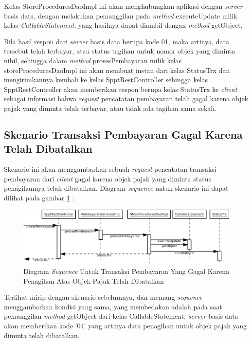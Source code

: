 Kelas StoreProceduresDaoImpl ini akan menghubungkan aplikasi dengan \textit{server} basis data, dengan melakukan pemanggilan pada \textit{method} executeUpdate milik kelas \textit{CallableStatement}, yang hasilnya dapat diambil dengan \textit{method} getObject.

Bila hasil respon dari \textit{server} basis data berupa kode 01, maka artinya, data tersebut telah terbayar, atau status tagihan untuk nomor objek yang diminta nihil, sehingga dalam \textit{method} prosesPembayaran milik kelas storeProceduresDaoImpl ini akan membuat instan dari kelas StatusTrx dan mengirimkannya kembali ke kelas SpptRestController sehingga kelas SpptRestController akan memberikan respon berupa kelas StatusTrx ke \textit{client} sebagai informasi bahwa \textit{request} pencatatan pembayaran telah gagal karena objek pajak yang diminta telah terbayar, atau tidak ada tagihan sama sekali.

\subsection{Skenario Transaksi Pembayaran Gagal Karena Telah Dibatalkan}

Skenario ini akan menggambarkan sebuah \textit{request} pencatatan transaksi pembayaran dari \textit{client} gagal karena objek pajak yang diminta status penagihannya telah dibatalkan. Diagram \textit{sequence} untuk skenario ini dapat dilihat pada gambar \ref{fig:uml-seq-trx-batal} :

\begin{figure}[H]
  \centering
  \includegraphics[width=1\textwidth]{./resources/uml/uml-seq-trx-batal}
  \caption{Diagram \textit{Sequence} Untuk Transaksi Pembayaran Yang Gagal Karena Penagihan Atas Objek Pajak Telah Dibatalkan}
  \label{fig:uml-seq-trx-batal}
\end{figure}

Terlihat mirip dengan skenario sebelumnya, dan memang \textit{sequence} menggambarkan kondisi yang sama, yang membedakan adalah pada saat pemanggilan \textit{method} getObject dari kelas CallableStatement, \textit{server} basis data akan memberikan kode '04' yang artinya data penagihan untuk objek pajak yang diminta telah dibatalkan.

